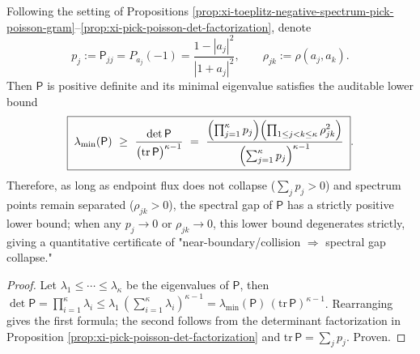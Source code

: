 \begin{corollary}\label{cor:xi-pick-poisson-gap-lower-bound}
Following the setting of Propositions \ref{prop:xi-toeplitz-negative-spectrum-pick-poisson-gram}--\ref{prop:xi-pick-poisson-det-factorization}, denote
\[
p_j:=\mathsf P_{jj}=P_{a_j}(-1)=\frac{1-|a_j|^2}{|1+a_j|^2},
\qquad
\rho_{jk}:=\rho(a_j,a_k).
\]
Then \(\mathsf P\) is positive definite and its minimal eigenvalue satisfies the auditable lower bound
\[
\boxed{\;
\lambda_{\min}(\mathsf P)\ \ge\ \frac{\det\mathsf P}{\bigl(\mathrm{tr}\,\mathsf P\bigr)^{\kappa-1}}
\ =\
\frac{\Bigl(\prod_{j=1}^{\kappa}p_j\Bigr)\Bigl(\prod_{1\le j<k\le\kappa}\rho_{jk}^2\Bigr)}
{\Bigl(\sum_{j=1}^{\kappa}p_j\Bigr)^{\kappa-1}}\; }.
\]
Therefore, as long as endpoint flux does not collapse (\(\sum_j p_j>0\)) and spectrum points remain separated (\(\rho_{jk}>0\)), the spectral gap of \(\mathsf P\) has a strictly positive lower bound; when any \(p_j\to0\) or \(\rho_{jk}\to0\), this lower bound degenerates strictly, giving a quantitative certificate of "near-boundary/collision \(\Rightarrow\) spectral gap collapse."
\end{corollary}
\begin{proof}
Let \(\lambda_1\le\cdots\le\lambda_\kappa\) be the eigenvalues of \(\mathsf P\), then
\(
\det\mathsf P=\prod_{i=1}^{\kappa}\lambda_i
\le \lambda_1\,(\sum_{i=1}^{\kappa}\lambda_i)^{\kappa-1}
=\lambda_{\min}(\mathsf P)\,(\mathrm{tr}\,\mathsf P)^{\kappa-1}
\).
Rearranging gives the first formula; the second follows from the determinant factorization in Proposition \ref{prop:xi-pick-poisson-det-factorization} and \(\mathrm{tr}\,\mathsf P=\sum_j p_j\). Proven.
\end{proof}

